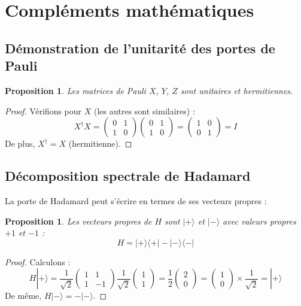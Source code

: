 \documentclass[12pt,a4paper]{article}
\newtheorem{proposition}[theorem]{Proposition}
\theoremstyle{definition}
\theoremstyle{remark}
\begin{document}
\newpage

\appendix
\section{Compléments mathématiques}

\subsection{Démonstration de l'unitarité des portes de Pauli}

\begin{proposition}
Les matrices de Pauli $X$, $Y$, $Z$ sont unitaires et hermitiennes.
\end{proposition}

\begin{proof}
Vérifions pour $X$ (les autres sont similaires) :
\[
X^\dagger X = \begin{pmatrix} 0 & 1 \\ 1 & 0 \end{pmatrix} \begin{pmatrix} 0 & 1 \\ 1 & 0 \end{pmatrix} = \begin{pmatrix} 1 & 0 \\ 0 & 1 \end{pmatrix} = I
\]
De plus, $X^\dagger = X$ (hermitienne).
\end{proof}

\subsection{Décomposition spectrale de Hadamard}

La porte de Hadamard peut s'écrire en termes de ses vecteurs propres :

\begin{proposition}
Les vecteurs propres de $H$ sont $|+\rangle$ et $|-\rangle$ avec valeurs propres $+1$ et $-1$ :
\[
H = |+\rangle\langle +| - |-\rangle\langle -|
\]
\end{proposition}

\begin{proof}
Calculons :
\[
H|+\rangle = \frac{1}{\sqrt{2}} \begin{pmatrix} 1 & 1 \\ 1 & -1 \end{pmatrix} \frac{1}{\sqrt{2}} \begin{pmatrix} 1 \\ 1 \end{pmatrix} = \frac{1}{2} \begin{pmatrix} 2 \\ 0 \end{pmatrix} = \begin{pmatrix} 1 \\ 0 \end{pmatrix} \times \frac{1}{\sqrt{2}} = |+\rangle
\]
De même, $H|-\rangle = -|-\rangle$.
\end{proof}
\end{document}
